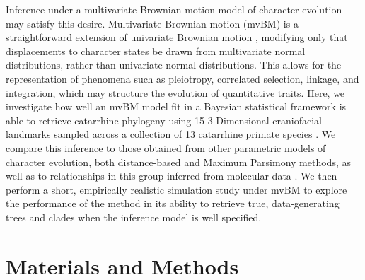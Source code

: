 Inference under a multivariate Brownian motion model of character evolution may satisfy this desire. Multivariate Brownian motion (mvBM) is a straightforward extension of univariate Brownian motion \citep{felsensteinMaximumlikelihoodEstimationEvolutionary1973}, modifying only that displacements to character states be drawn from multivariate normal distributions, rather than univariate normal distributions. This allows for the representation of phenomena such as pleiotropy, correlated selection, linkage, and integration, which may structure the evolution of quantitative traits. Here, we investigate how well an mvBM model fit in a Bayesian statistical framework is able to retrieve catarrhine phylogeny using 15 3-Dimensional craniofacial landmarks sampled across a collection of 13 catarrhine primate species \citep{harvatiNeanderthalTaxonomyReconsidered2004}. We compare this inference to those obtained from other parametric models of character evolution, both distance-based and Maximum Parsimony methods, as well as to relationships in this group inferred from molecular data \citep{arnold10kTreesWebsiteNew2010}. We then perform a short, empirically realistic simulation study under mvBM to explore the performance of the method in its ability to retrieve true, data-generating trees and clades when the inference model is well specified. 

\clearpage

\section{Materials and Methods}

